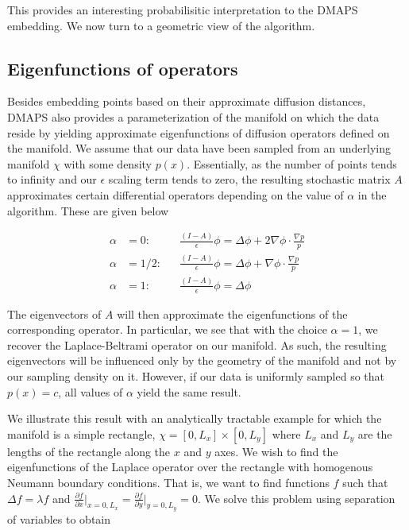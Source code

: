 This provides an interesting probabilisitic interpretation to the
DMAPS embedding. We now turn to a geometric view of the algorithm.

\subsection{Eigenfunctions of operators}

Besides embedding points based on their approximate diffusion
distances, DMAPS also provides a parameterization of the manifold on
which the data reside by yielding approximate eigenfunctions of
diffusion operators defined on the manifold. We assume that our data
have been sampled from an underlying manifold $\chi$ with some density
$p(x)$. Essentially, as the number of points tends to infinity and our
$\epsilon$ scaling term tends to zero, the resulting stochastic matrix
$A$ approximates certain differential operators depending on the value
of $\alpha$ in the algorithm. These are given below

\begin{equation}
\begin{aligned}
  \alpha &= 0: &&\frac{(I - A)}{\epsilon} \phi = \Delta \phi + 2
    \nabla \phi \cdot \frac{\nabla p}{p} \\
  \alpha &= 1/2: &&\frac{(I - A)}{\epsilon} \phi = \Delta \phi +
    \nabla \phi \cdot \frac{\nabla p}{p} \\
  \alpha &= 1: &&\frac{(I - A)}{\epsilon} \phi = \Delta \phi
\end{aligned}
\end{equation}

The eigenvectors of $A$ will then approximate the eigenfunctions of
the corresponding operator. In particular, we see that with the choice
$\alpha = 1$, we recover the Laplace-Beltrami operator on our
manifold. As such, the resulting eigenvectors will be influenced only
by the geometry of the manifold and not by our sampling density on
it. However, if our data is uniformly sampled so that $p(x) = c$, all
values of $\alpha $ yield the same result.

We illustrate this result with an analytically tractable example for
which the manifold is a simple rectangle, $\chi = [0, L_x] \times [0,
L_y]$ where $L_x$ and $L_y$ are the lengths of the rectangle along the
$x$ and $y$ axes. We wish to find the eigenfunctions of the Laplace
operator over the rectangle with homogenous Neumann boundary
conditions. That is, we want to find functions $f$ such that $\Delta f
= \lambda f$ and $\frac{\partial f}{\partial x}\Big|_{x=0,L_x}
=\frac{\partial f}{\partial y}\Big|_{y=0,L_y} = 0$. We solve this
problem using separation of variables to obtain

